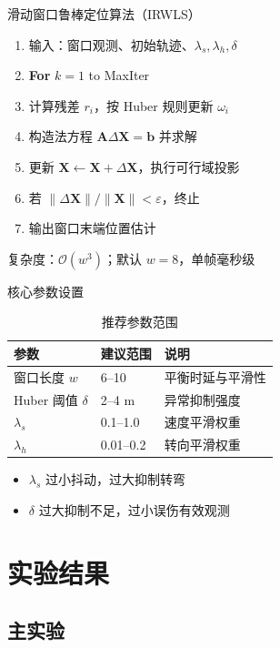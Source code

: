 \documentclass[aspectratio=169]{beamer}
\begin{document}
\begin{frame}{滑动窗口鲁棒定位算法（IRWLS）}
  \small
  \begin{enumerate}
    \setlength{\itemsep}{4pt}
    \item 输入：窗口观测、初始轨迹、$\lambda_s,\lambda_h,\delta$
    \item \textbf{For} $k=1$ to MaxIter
    \item \quad 计算残差 $r_i$，按 Huber 规则更新 $\omega_i$
    \item \quad 构造法方程 $\bm A\Delta\bm X=\bm b$ 并求解
    \item \quad 更新 $\bm X\leftarrow\bm X+\Delta\bm X$，执行可行域投影
    \item \quad 若 $\|\Delta\bm X\|/\|\bm X\|<\varepsilon$，终止
    \item 输出窗口末端位置估计
  \end{enumerate}
  \normalsize
  复杂度：$\mathcal O(w^3)$；默认 $w=8$，单帧毫秒级
\end{frame}

\begin{frame}{核心参数设置}
  \begin{table}
    \centering
    \caption{推荐参数范围}
    \small
    \begin{tabular}{lll}
      \toprule
      参数 & 建议范围 & 说明 \\
      \midrule
      窗口长度 $w$ & 6--10 & 平衡时延与平滑性 \\
      Huber 阈值 $\delta$ & 2--4 m & 异常抑制强度 \\
      $\lambda_s$ & 0.1--1.0 & 速度平滑权重 \\
      $\lambda_h$ & 0.01--0.2 & 转向平滑权重 \\
      \bottomrule
    \end{tabular}
  \end{table}
  \begin{itemize}
    \item $\lambda_s$ 过小抖动，过大抑制转弯
    \item $\delta$ 过大抑制不足，过小误伤有效观测
  \end{itemize}
\end{frame}

\section{实验结果}

\subsection{主实验}
\end{document}
